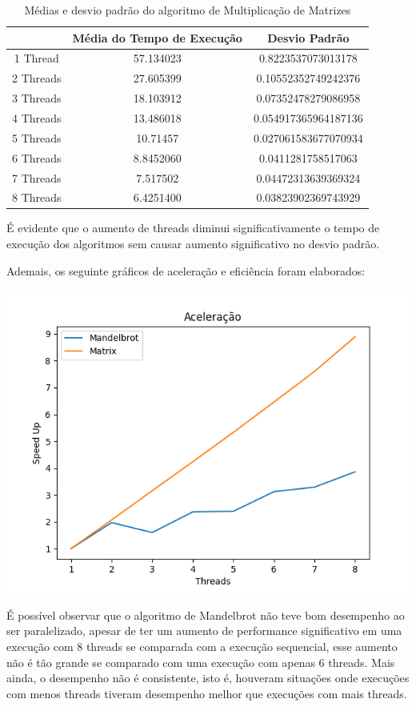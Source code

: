 \documentclass[10pt,a4paper]{article}
\begin{document}
		\begin{table}[htb]
			\begin{tabular}{|c|c|c|}
				\hline
				& Média do Tempo de Execução & Desvio Padrão \\ \hline
				1 Thread  & 57.134023 & 0.8223537073013178   \\ \hline
				2 Threads & 27.605399 & 0.10552352749242376  \\ \hline
				3 Threads & 18.103912 & 0.07352478279086958  \\ \hline
				4 Threads & 13.486018 & 0.054917365964187136 \\ \hline
				5 Threads & 10.71457  & 0.027061583677070934 \\ \hline
				6 Threads & 8.8452060 & 0.0411281758517063   \\ \hline
				7 Threads & 7.517502  & 0.04472313639369324  \\ \hline
				8 Threads & 6.4251400 & 0.03823902369743929  \\ \hline
			\end{tabular}
			\caption{Médias e desvio padrão do algoritmo de Multiplicação de Matrizes}
		\end{table}

		É evidente que o aumento de threads diminui significativamente o tempo de execução dos algoritmos sem causar 
		aumento significativo no desvio padrão.

		Ademais, os seguinte gráficos de aceleração e eficiência foram elaborados:

		\includegraphics[scale=.7]{SpeedUp.png}

		É possível observar que o algoritmo de Mandelbrot não teve bom desempenho ao ser paralelizado, apesar de 
		ter um aumento de performance significativo em uma execução com 8 threads se comparada com a execução sequencial, 
		esse aumento não é tão grande se comparado com uma execução com apenas 6 threads. Mais ainda, o desempenho não é consistente, isto é,
		houveram situações onde execuções com menos threads tiveram desempenho melhor que execuções com mais threads.
\end{document}

